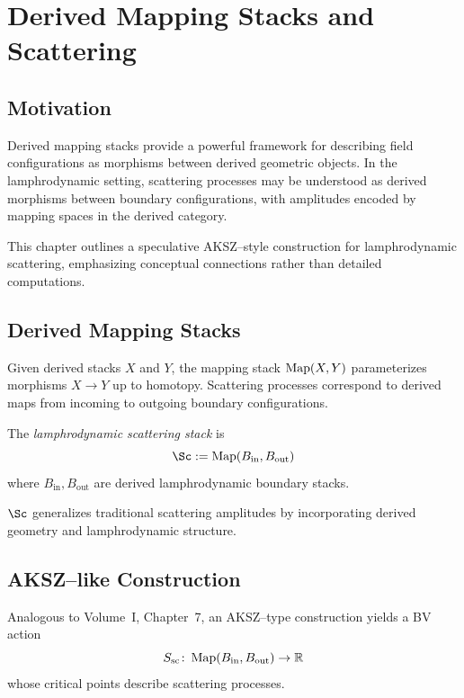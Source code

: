 
\chapter{Derived Mapping Stacks and Scattering}
\label{chap:derived-scattering}

\section{Motivation}

Derived mapping stacks provide a powerful framework for describing
field configurations as morphisms between derived geometric objects. In
the lamphrodynamic setting, scattering processes may be understood as
derived morphisms between boundary configurations, with amplitudes
encoded by mapping spaces in the derived category.

This chapter outlines a speculative AKSZ--style construction for
lamphrodynamic scattering, emphasizing conceptual connections rather
than detailed computations.


\section{Derived Mapping Stacks}

Given derived stacks $X$ and $Y$, the mapping stack $\operatorname{Map}(X,Y)$
parameterizes morphisms $X\to Y$ up to homotopy. Scattering processes
correspond to derived maps from incoming to outgoing boundary
configurations.

\begin{definition}
The \emph{lamphrodynamic scattering stack} is
\[
  \Sc := \Map(B_{\mathrm{in}},B_{\mathrm{out}})
\]
where $B_{\mathrm{in}},B_{\mathrm{out}}$ are derived lamphrodynamic
boundary stacks.
\end{definition}

\begin{remark}
$\Sc$ generalizes traditional scattering amplitudes by incorporating
derived geometry and lamphrodynamic structure.
\end{remark}


\section{AKSZ--like Construction}

Analogous to Volume~I, Chapter~7, an AKSZ--type construction yields a BV
action
\[
  S_{\mathrm{sc}} \colon \operatorname{Map}(B_{\mathrm{in}},B_{\mathrm{out}})\to\mathbb{R}
\]
whose critical points describe scattering processes.

